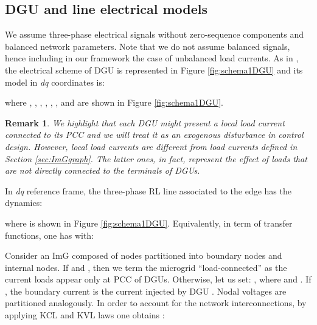 \documentclass[a4paper]{article}
\theoremstyle{plain}
\newtheorem{rmk}{Remark}
\begin{document}
\subsection{DGU and line electrical models}
     We assume three-phase electrical signals without zero-sequence components and balanced network parameters. 
Note that we do not assume balanced signals, hence including in our framework the case of unbalanced load currents. As in \cite{babazadeh2013robust}, the electrical scheme of DGU  is represented in Figure \ref{fig:schema1DGU} and its model in \emph{dq} coordinates is:

    where , , , , , ,  and  are shown in Figure \ref{fig:schema1DGU}. 
    \begin{rmk}
    	We highlight that each DGU might present a local load current  connected to its PCC and we will treat it as an exogenous disturbance in control design. However, local load currents  are different from load currents  defined in Section \ref{sec:ImGgraph}. The latter ones, in fact, represent the effect of loads that are not directly connected to the terminals of DGUs. \hspace{70mm} 
    \end{rmk} 

In \emph{dq} reference frame, the three-phase RL line associated to the edge  has the dynamics:
    
    where  is shown in Figure \ref{fig:schema1DGU}. Equivalently, in term of transfer functions, one has  with:
    
Consider an ImG composed of  nodes partitioned into  boundary nodes and  internal nodes. If  and , then we term the microgrid ``load-connected'' as the current loads appear only at PCC of DGUs. Otherwise, let us set: , where  and . If , the boundary current  is the current  injected by DGU . Nodal voltages 
are partitioned analogously. In order to account for the network interconnections, by applying KCL and KVL laws one obtains \cite{dhople2014synchronization}:
    
\end{document}
